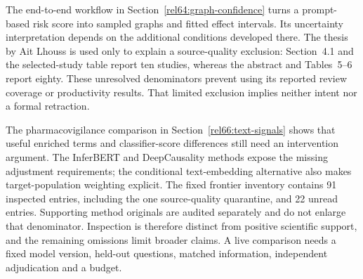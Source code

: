 The end-to-end workflow in Section~\ref{rel64:graph-confidence} turns a
prompt-based risk score into sampled graphs and fitted effect intervals. Its
uncertainty interpretation depends on the additional conditions developed
there. The thesis by Ait Lhouss is used only to explain a source-quality
exclusion: Section~4.1 and the selected-study table report ten studies, whereas
the abstract and Tables~5--6 report eighty. These unresolved denominators
prevent using its reported review coverage or productivity results. That
limited exclusion implies neither intent nor a formal retraction.
\citep{rel64molero,rel64aitlhouss}

The pharmacovigilance comparison in Section~\ref{rel66:text-signals} shows
that useful enriched terms and classifier-score differences still need an
intervention argument. The InferBERT and DeepCausality methods expose the
missing adjustment requirements; the conditional text-embedding alternative
also makes target-population weighting explicit. The fixed frontier inventory
contains 91 inspected entries, including the one source-quality quarantine,
and 22 unread entries. Supporting method originals are audited separately
and do not enlarge that denominator. Inspection is therefore distinct from
positive scientific support, and the remaining omissions limit broader claims.
A live comparison needs a fixed model version, held-out questions, matched
information, independent adjudication and a budget. \citep{rel66pharma,rel66inferbert,rel66deepcausality,rel66veitch}





